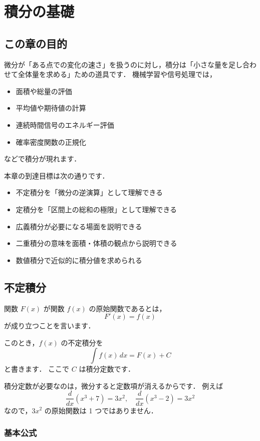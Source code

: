 
\chapter{積分の基礎}


\section{この章の目的}

微分が「ある点での変化の速さ」を扱うのに対し，積分は「小さな量を足し合わせて全体量を求める」ための道具です．
機械学習や信号処理では，
\begin{itemize}
\item 面積や総量の評価
\item 平均値や期待値の計算
\item 連続時間信号のエネルギー評価
\item 確率密度関数の正規化
\end{itemize}
などで積分が現れます．

本章の到達目標は次の通りです．
\begin{itemize}
\item 不定積分を「微分の逆演算」として理解できる
\item 定積分を「区間上の総和の極限」として理解できる
\item 広義積分が必要になる場面を説明できる
\item 二重積分の意味を面積・体積の観点から説明できる
\item 数値積分で近似的に積分値を求められる
\end{itemize}


\section{不定積分}

関数 $F(x)$ が関数 $f(x)$ の原始関数であるとは，
\[
F'(x) = f(x)
\]
が成り立つことを言います．

このとき，$f(x)$ の不定積分を
\[
\int f(x)\,dx = F(x) + C
\]
と書きます．
ここで $C$ は積分定数です．

積分定数が必要なのは，微分すると定数項が消えるからです．
例えば
\[
\frac{d}{dx}(x^3 + 7) = 3x^2, \quad
\frac{d}{dx}(x^3 - 2) = 3x^2
\]
なので，$3x^2$ の原始関数は 1 つではありません．

\subsection{基本公式}


